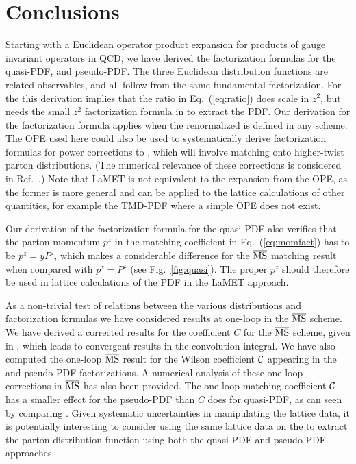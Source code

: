 \section{Conclusions}
\label{sec:summary}

Starting with a Euclidean operator product expansion for products of gauge invariant operators in QCD, we have derived the factorization formulas for the quasi-PDF, \spcorr and pseudo-PDF. The three Euclidean distribution functions are related observables, and all follow from the same fundamental factorization.  For the \spcorr this derivation implies that the ratio in Eq.~(\ref{eq:ratio}) does scale in $z^2$, but needs the small $z^2$ factorization formula in  to extract the PDF.
%
Our derivation for the factorization formula applies when the renormalized \spcorr is defined in any scheme.
The OPE used here could also be used to systematically derive factorization formulas for power corrections to , which will involve matching onto higher-twist parton distributions. (The numerical relevance of these corrections is considered in Ref.~\cite{Chen:2016utp}.)
%
Note that LaMET is not equivalent to the expansion from the OPE, as the former is more general and can be applied to the lattice calculations of other quantities, for example the TMD-PDF where a simple OPE does not exist.

Our derivation of the factorization formula for the quasi-PDF also verifies that the parton momentum $p^z$ in the matching coefficient in Eq.~(\ref{eq:momfact}) has to be $p^z=yP^z$, which makes a considerable difference for the $\overline{\rm MS}$  matching result when compared with $p^z=P^z$ (see Fig.~\ref{fig:quasi}). The proper $p^z$ should therefore be used in lattice calculations of the PDF in the LaMET approach.

As a non-trivial test of relations between the various distributions and factorization formulas we have considered results at one-loop in the $\overline{\rm MS}$ scheme. We have derived a corrected results for the coefficient $C$ for the $\overline{\rm MS}$ scheme, given in , which leads to convergent results in the convolution integral.   We have also computed the one-loop $\overline{\rm MS}$ result for the Wilson coefficient ${\cal C}$ appearing in the \spcorr and pseudo-PDF factorizations. A numerical analysis of these one-loop corrections in $\overline{\rm MS}$ has also been provided. The one-loop matching coefficient ${\cal C}$ has a smaller effect for the pseudo-PDF than $C$ does for quasi-PDF, as can seen by comparing . Given systematic uncertainties in manipulating the lattice data, it is potentially interesting to consider using the same lattice data on the \spcorr to extract the parton distribution function using both the quasi-PDF and pseudo-PDF approaches.

